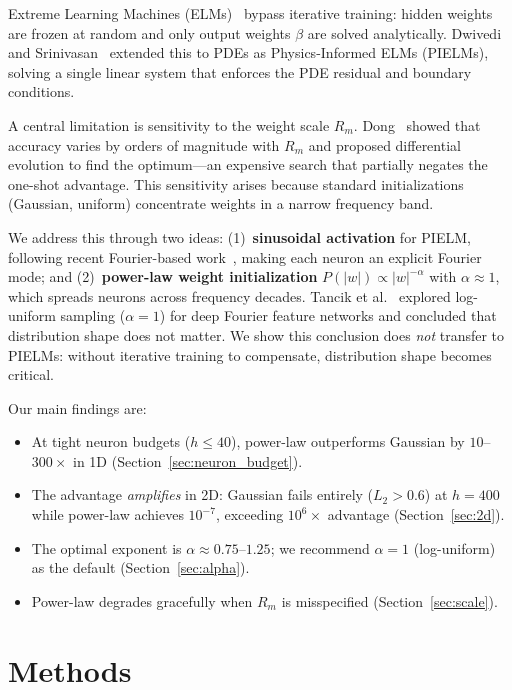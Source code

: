 \documentclass[final,12pt,3p,times,fleqn]{elsarticle}
\begin{document}
Extreme Learning Machines (ELMs)~\cite{huang2006extreme} bypass iterative training: hidden weights are frozen at random and only output weights $\beta$ are solved analytically. Dwivedi and Srinivasan~\cite{dwivedi2020pielm} extended this to PDEs as Physics-Informed ELMs (PIELMs), solving a single linear system that enforces the PDE residual and boundary conditions.

A central limitation is sensitivity to the weight scale $R_m$. Dong~\cite{dong2022computing} showed that accuracy varies by orders of magnitude with $R_m$ and proposed differential evolution to find the optimum---an expensive search that partially negates the one-shot advantage. This sensitivity arises because standard initializations (Gaussian, uniform) concentrate weights in a narrow frequency band.

We address this through two ideas: (1)~\textbf{sinusoidal activation} for PIELM, following recent Fourier-based work~\cite{li2023fpielm,ren2025gffpielm,sitzmann2020siren}, making each neuron an explicit Fourier mode; and (2)~\textbf{power-law weight initialization} $P(|w|) \propto |w|^{-\alpha}$ with $\alpha \approx 1$, which spreads neurons across frequency decades. Tancik et al.~\cite{tancik2020fourier} explored log-uniform sampling ($\alpha = 1$) for deep Fourier feature networks and concluded that distribution shape does not matter. We show this conclusion does \emph{not} transfer to PIELMs: without iterative training to compensate, distribution shape becomes critical.

Our main findings are:
\begin{itemize}
    \item At tight neuron budgets ($h \leq 40$), power-law outperforms Gaussian by $10$--$300\times$ in 1D (Section~\ref{sec:neuron_budget}).
    \item The advantage \emph{amplifies} in 2D: Gaussian fails entirely ($L_2 > 0.6$) at $h = 400$ while power-law achieves $10^{-7}$, exceeding $10^6\times$ advantage (Section~\ref{sec:2d}).
    \item The optimal exponent is $\alpha \approx 0.75$--$1.25$; we recommend $\alpha = 1$ (log-uniform) as the default (Section~\ref{sec:alpha}).
    \item Power-law degrades gracefully when $R_m$ is misspecified (Section~\ref{sec:scale}).
\end{itemize}


\section{Methods}
\label{sec:methods}
\end{document}
